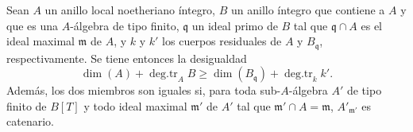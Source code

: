 \begin{theorem}
\label{IV.2.s5.5.8-fr}
Sean $A$ un anillo local noetheriano íntegro, $B$ un anillo íntegro que
contiene a $A$ y que es una $A$-álgebra de tipo finito, $\mathfrak q$ un ideal
primo de $B$ tal que $\mathfrak q\cap A$ es el ideal maximal $\mathfrak m$ de
$A$, y $k$ y $k'$ los cuerpos residuales de $A$ y $B_{\mathfrak q}$,
respectivamente. Se tiene entonces la desigualdad
\begin{equation}
\dim(A)+\operatorname{deg.tr}_A B
\geq\dim(B_{\mathfrak q})+\operatorname{deg.tr}_k k'.
\tag{5.5.8.1}\label{IV.2.s5.5.8.1-fr}
\end{equation}
Además, los dos miembros son iguales si, para toda sub-$A$-álgebra $A'$ de
tipo finito de $B[T]$ y todo ideal maximal $\mathfrak m'$ de $A'$ tal que
$\mathfrak m'\cap A=\mathfrak m$, $A'_{\mathfrak m'}$ es catenario.
\end{theorem}

